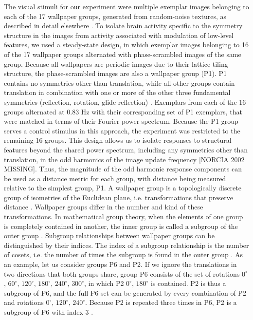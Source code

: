 \documentclass[9pt,twocolumn,twoside,lineno]{pnas-new}
\begin{document}
The visual stimuli for our experiment were multiple exemplar images belonging to each of the 17 wallpaper groups, generated from random-noise textures, as described in detail elsewhere \cite{RN1725}. To isolate brain activity specific to the symmetry structure in the images from activity associated with modulation of low-level features, we used a steady-state design, in which exemplar images belonging to 16 of the 17 wallpaper groups alternated with phase-scrambled images of the same group. Because all wallpapers are periodic images due to their lattice tiling structure, the phase-scrambled images are also a wallpaper group (P1). P1 contains no symmetries other than translation, while all other groups contain translation in combination with one or more of the other three fundamental symmetries (reflection, rotation, glide reflection) \cite{RN1425}. 
Exemplars from each of the 16 groups alternated at 0.83 Hz with their corresponding set of P1 exemplars, that were matched in terms of their Fourier power spectrum. Because the P1 group serves a control stimulus in this approach, the experiment was restricted to the remaining 16 groups. This design allows us to isolate responses to structural features beyond the shared power spectrum, including any symmetries other than translation, in the odd harmonics of the image update frequency \cite{RN1725,RN1540} [NORCIA 2002 MISSING]. Thus, the magnitude of the odd harmonic response components can be used as a distance metric for each group, with distance being measured relative to the simplest group, P1. A wallpaper group is a topologically discrete group of isometries of the Euclidean plane, i.e. transformations that preserve distance \cite{RN1425}. Wallpaper groups differ in the number and kind of these transformations. In mathematical group theory, when the elements of one group is completely contained in another, the inner group is called a subgroup of the outer group \cite{RN1425}. Subgroup relationships between wallpaper groups can be distinguished by their indices. The index of a subgroup relationship is the number of cosets, i.e. the number of times the subgroup is found in the outer group \cite{RN1425}. As an example, let us consider groups P6 and P2. If we ignore the translations in two directions that both groups share, group P6 consists of the set of rotations {$0^{\circ}$, $60^{\circ}$, $120^{\circ}$, $180^{\circ}$, $240^{\circ}$, $300^{\circ}$}, in which P2 {$0^{\circ}$, $180^{\circ}$} is contained. P2 is thus a subgroup of P6, and the full P6 set can be generated by every combination of P2 and rotations {$0^{\circ}$, $120^{\circ}$, $240^{\circ}$}. Because P2 is repeated three times in P6, P2 is a subgroup of P6 with index 3 \cite{RN1425}.
\end{document}
